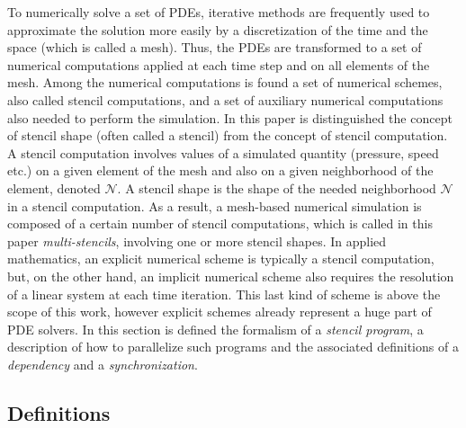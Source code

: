 To numerically solve a set of PDEs, iterative methods are frequently used to approximate the solution more easily by a discretization of the time and the space (which is called a mesh). Thus, the PDEs are transformed to a set of numerical computations applied at each time step and on all elements of the mesh. Among the numerical computations is found a set of numerical schemes, also called stencil computations, and a set of auxiliary numerical computations also needed to perform the simulation. 
In this paper is distinguished the concept of stencil shape (often called a stencil) from the concept of stencil computation. A stencil computation involves values of a simulated quantity (pressure, speed etc.) on a given element of the mesh and also on a given neighborhood of the element, denoted $\mathcal{N}$. A stencil shape is the shape of the needed neighborhood $\mathcal{N}$ in a stencil computation. As a result, a mesh-based numerical simulation is composed of a certain number of stencil computations, which is called in this paper \textit{multi-stencils}, involving one or more stencil shapes. In applied mathematics, an explicit numerical scheme is typically a stencil computation, but, on the other hand, an implicit numerical scheme also requires the resolution of a linear system at each time iteration. This last kind of scheme is above the scope of this work, however explicit schemes already represent a huge part of PDE solvers. In this section is defined the formalism of a \textit{stencil program}, a description of how to parallelize such programs and the associated definitions of a \textit{dependency} and a \textit{synchronization}. %

\subsection{Definitions}

